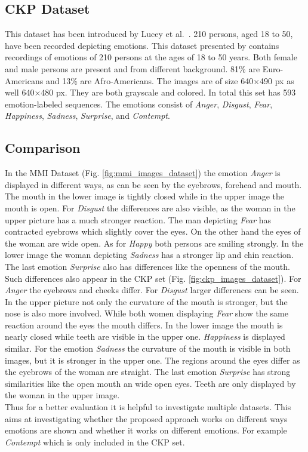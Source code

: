 \subsection{CKP Dataset}
\label{sec:ckp}

This dataset has been introduced by Lucey et al.~\cite{5543262}. 210 persons, aged 18 to 50, have been recorded depicting emotions.
This dataset presented by  contains recordings of emotions of 210 persons at the ages of 18 to 50 years. Both female and male persons are present and from different background. 81\% are Euro-Americans and 13\% are Afro-Americans. The images are of size 640$\times$490 px as well 640$\times$480 px. They are both grayscale and colored. In total this set has 593 emotion-labeled sequences. The emotions consist of \textit{Anger}, \textit{Disgust}, \textit{Fear}, \textit{Happiness}, \textit{Sadness}, \textit{Surprise}, and \textit{Contempt}.



\subsection{Comparison}
\label{sec:comparison}
In the MMI Dataset (Fig. \ref{fig:mmi_images_dataset}) the emotion \textit{Anger} is displayed in different ways, as can be seen by the eyebrows, forehead and mouth. The mouth in the lower image is tightly closed while in the upper image the mouth is open. For \textit{Disgust} the differences are also visible, as the woman in the upper picture has a much stronger reaction. The man depicting \textit{Fear} has contracted eyebrows which slightly cover the eyes. On the other hand the eyes of the woman are wide open. As for \textit{Happy} both persons are smiling strongly. In the lower image the woman depicting \textit{Sadness} has a stronger lip and chin reaction. The last emotion \textit{Surprise} also has differences like the openness of the mouth.\\

Such differences also appear in the CKP set (Fig. \ref{fig:ckp_images_dataset}). 
For \textit{Anger} the eyebrows and cheeks differ.
For \textit{Disgust} larger differences can be seen. In the upper picture not only the curvature of the mouth is stronger, but the nose is also more involved. While both women displaying \textit{Fear} show the same reaction around the eyes the mouth differs. In the lower image the mouth is nearly closed while teeth are visible in the upper one. \textit{Happiness} is displayed similar. For the emotion \textit{Sadness} the curvature of the mouth is visible in both images, but it is stronger in the upper one. The regions around the eyes differ as the eyebrows of the woman are straight. The last emotion \textit{Surprise} has strong similarities like the open mouth an wide open eyes. Teeth are only displayed by the woman in the upper image.\\
Thus for a better evaluation it is helpful to investigate multiple datasets. This aims at investigating whether the proposed approach works on different ways emotions are shown and whether it works on different emotions. For example \textit{Contempt} which is only included in the CKP set.





